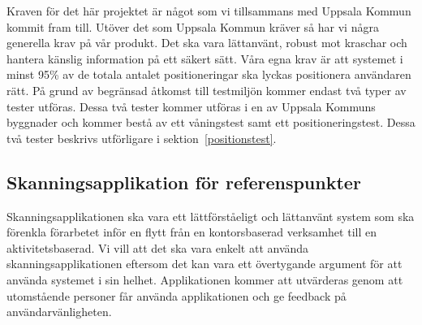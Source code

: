 \documentclass[a4paper,12pt]{article}
\begin{document}

 Kraven för det här projektet är något som vi tillsammans med Uppsala Kommun kommit fram till. Utöver det som Uppsala Kommun kräver så har vi några generella krav på vår produkt. Det ska vara lättanvänt, robust mot kraschar och hantera känslig information på ett säkert sätt. Våra egna krav är att systemet i minst 95\% av de totala antalet positioneringar ska lyckas positionera användaren rätt. På grund av begränsad åtkomst till testmiljön kommer endast två typer av tester utföras. Dessa två tester kommer utföras i en av Uppsala Kommuns byggnader och kommer bestå av ett våningstest samt ett positioneringstest. Dessa två tester beskrivs utförligare i sektion~\ref{positionstest}.

 \subsection{Skanningsapplikation för referenspunkter}
 Skanningsapplikationen ska vara ett lättförståeligt och lättanvänt system som ska förenkla förarbetet inför en flytt från en kontorsbaserad verksamhet till en aktivitetsbaserad. Vi vill att det ska vara enkelt att använda skanningsapplikationen eftersom det kan vara ett övertygande argument för att använda systemet i sin helhet. Applikationen kommer att utvärderas genom att utomstående personer får använda applikationen och ge feedback på användarvänligheten.
\end{document}
